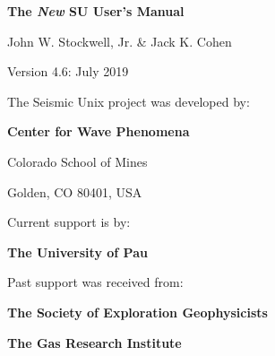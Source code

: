 %
%
%
\begin{titlepage}
\vspace*{2.3 in}
\centerline{\Huge \bf The {\em New\/} SU User's Manual}
\vspace{0.3in}
\centerline{\Large John W. Stockwell, Jr. \& Jack K. Cohen}
\vspace{0.5in}
\centerline{\Large Version 4.6: July 2019}

\vfill

\centerline{The Seismic Unix project was developed by:}
\vspace{3ex}
\centerline{\bf Center for Wave Phenomena}
\vspace{2ex}
\centerline{\epsfysize=0.675in }
\vspace{2ex}
\centerline{Colorado School of Mines}
\centerline{Golden, CO 80401, USA}
\vspace{2ex}
\centerline{Current support is by:}
\vspace{2ex}
\centerline{\bf The University of Pau}
\vspace{2ex}
\centerline{Past support was received from:}
\vspace{2ex}
\centerline{\bf The Society of Exploration Geophysicists}
\vspace{2ex}
\centerline{\epsfysize=0.775in }
\vspace{2ex}
\vspace{2ex}
\centerline{\bf The Gas Research Institute}
\vspace{2ex}
\centerline{\epsfysize=0.475in }

\end{titlepage}
%
